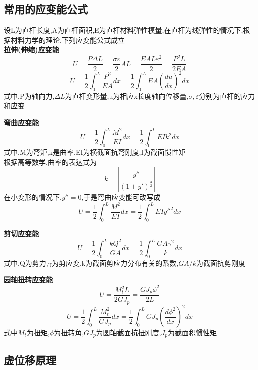 \documentclass{article}
\begin{document}
\subsection{常用的应变能公式}
设L为直杆长度,A为直杆面积,E为直杆材料弹性模量,在直杆为线弹性的情况下,根据材料力学的理论,下列应变能公式成立\\
\textbf{拉伸(伸缩)应变能}
\begin{equation}
 U=\frac{P\Delta L}{2}=\frac{\sigma \varepsilon}{2}AL=\frac{EAL\varepsilon^2}{2}=\frac{P^2L}{2EA}
\end{equation}
\begin{equation}
 U=\frac{1}{2}\int_{0}^{L}\frac{P^2}{EA}dx=\frac{1}{2}\int_{0}^{L}EA(\frac{du}{dx})^2dx
\end{equation}
式中,P为轴向力,$\Delta L$为直杆变形量,u为相应x长度轴向位移量,$\sigma,\varepsilon$分别为直杆的应力和应变

\textbf{弯曲应变能}
\begin{equation}
 U=\frac{1}{2}\int_{0}^{L}\frac{M^2}{EI}dx=\frac{1}{2}\int_{0}^{L}EIk^2dx
\end{equation}
式中,M为弯矩,k是曲率,EI为横截面抗弯刚度,I为截面惯性矩\\
根据高等数学,曲率的表达式为
\begin{equation}
 k=|\frac{y''}{(1+y')^{\frac{3}{2}}}|
\end{equation}
在小变形的情况下,$y''=0$,于是弯曲应变能可改写成
\begin{equation}
 U=\frac{1}{2}\int_{0}^{L}\frac{M^2}{EI}dx=\frac{1}{2}\int_{0}^{L}EIy''^2dx
\end{equation}

\textbf{剪切应变能}
\begin{equation}
 U=\frac{1}{2}\int_{0}^{L}\frac{kQ^2}{GA}dx=\frac{1}{2}\int_{0}^{L}\frac{GA\gamma^2}{k}dx
\end{equation}
式中,Q为剪力,$\gamma$为剪应变,k为截面剪应力分布有关的系数,$GA/k$为截面抗剪刚度

\textbf{园轴扭转应变能}
\begin{equation}
 U=\frac{M_t^2 L}{2GJ_p}=\frac{GJ_p\phi^2}{2L}
\end{equation}
\begin{equation}
 U=\frac{1}{2}\int_{0}^{L}\frac{M_t^2}{GJ_p}dx=\frac{1}{2}\int_{0}^{L}GJ_p(\frac{d\phi^2}{dx})^2dx
\end{equation}
式中$M_t$为扭矩,$\phi$为扭转角,$GJ_p$为圆轴截面抗扭刚度,$J_p$为截面积惯性矩

\subsection{虚位移原理}
\end{document}
